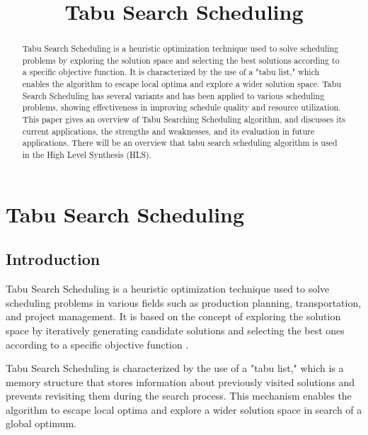 \documentclass[conference]{IEEEtran}
\begin{document}
\title{Tabu Search Scheduling}

\author{
}

\maketitle

\begin{abstract}

Tabu Search Scheduling is a heuristic optimization technique used to solve scheduling problems by exploring the solution space and selecting the best solutions according to a specific objective function. It is characterized by the use of a "tabu list," which enables the algorithm to escape local optima and explore a wider solution space. Tabu Search Scheduling has several variants and has been applied to various scheduling problems, showing effectiveness in improving schedule quality and resource utilization. This paper gives an overview of Tabu Searching Scheduling algorithm, and discusses its current applications, the strengths and weaknesses, and its evaluation in future applications. There will be an overview that tabu search scheduling algorithm is used in the High Level Synthesis (HLS).

\end{abstract}
\section{Tabu Search Scheduling}

\subsection{Introduction}

Tabu Search Scheduling is a heuristic optimization technique used to solve scheduling problems in various fields such as production planning, transportation, and project management. It is based on the concept of exploring the solution space by iteratively generating candidate solutions and selecting the best ones according to a specific objective function \cite{Barnes1995}.

Tabu Search Scheduling is characterized by the use of a "tabu list," which is a memory structure that stores information about previously visited solutions and prevents revisiting them during the search process. This mechanism enables the algorithm to escape local optima and explore a wider solution space in search of a global optimum.
\end{document}
